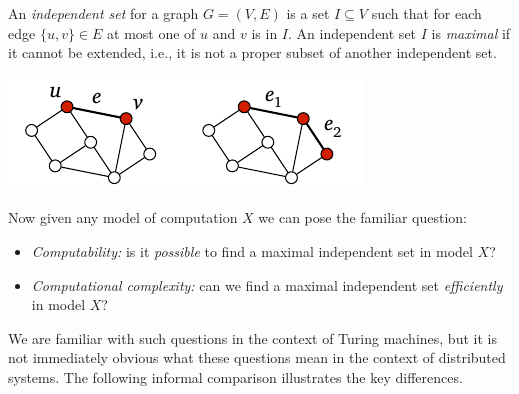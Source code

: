 An \emph{independent set} for a graph $G = (V,E)$ is a set $I \subseteq V$ such that for each edge $\{u,v\} \in E$ at most one of $u$ and $v$ is in $I$. An independent set $I$ is \emph{maximal} if it cannot be extended, i.e., it is not a proper subset of another independent set.
\begin{center}
    \includegraphics[page=\PIndependentSet]{figs.pdf}
\end{center}

Now given any model of computation $X$ we can pose the familiar question:
\begin{itemize}
    \item \emph{Computability:} is it \emph{possible} to find a maximal independent set in model $X$?
    \item \emph{Computational complexity:} can we find a maximal independent set \emph{efficiently} in model $X$?
\end{itemize}
We are familiar with such questions in the context of Turing machines, but it is not immediately obvious what these questions mean in the context of distributed systems. The following informal comparison illustrates the key differences.
